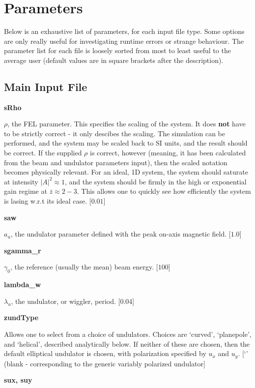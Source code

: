\documentclass[12pt]{article}%
\begin{document}
\section{Parameters}


Below is an exhaustive list of parameters, for each input file type. Some options are only really useful for investigating runtime errors or strange behaviour. The parameter list for each file is loosely sorted from most to least useful to the average user (default values are in square brackets after the description).


\subsection{Main Input File}

{\bf sRho}

$\rho$, the FEL parameter. This specifies the scaling of the system. It does {\bf not} have to be strictly correct - it only descibes the scaling. The simulation can be performed, and the system may be scaled back to SI units, and the result should be correct. If the supplied $\rho$ is correct, however (meaning, it has been calculated from the beam and undulator parameters input), then the scaled notation becomes physically relevant. For an ideal, 1D system, the system should saturate at intensity $|A|^2 \approx 1$, and the system should be firmly in the high or exponential gain regime at $\bar{z} \approx 2-3$. This allows one to quickly see how efficiently the system is lasing w.r.t its ideal case. [$0.01$]


{\bf saw}

$a_u$, the undulator parameter defined with the peak on-axis magnetic field. [$1.0$]

{\bf sgamma\_r}

$\gamma_0$, the reference (usually the mean) beam energy. [$100$]

{\bf lambda\_w}

$\lambda_u$, the undulator, or wiggler, period. [0.04]

{\bf zundType}

Allows one to select from a choice of undulators. Choices are `curved', `planepole', and `helical', described analytically below. If neither of these are chosen, then the default elliptical undulator is chosen, with polarization specified by $u_x$ and $u_y$. [`' (blank - corresponding to the generic variably polarized undulator]

{\bf sux, suy}
\end{document}
